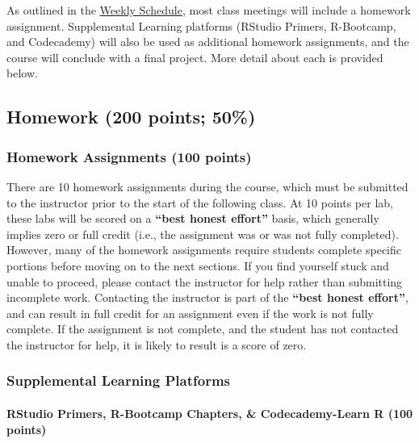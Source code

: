 \documentclass[
  letterpaper,
  DIV=11,
  numbers=noendperiod]{scrartcl}
\let\oldparagraph\paragraph
\renewcommand{\paragraph}[1]{\oldparagraph{#1}\mbox{}}
\begin{document}
As outlined in the \href{INCLUDE\%20LINK!!}{Weekly Schedule}, most class
meetings will include a homework assignment. Supplemental Learning
platforms (RStudio Primers, R-Bootcamp, and Codecademy) will also be
used as additional homework assignments, and the course will conclude
with a final project. More detail about each is provided below.

\hypertarget{homework-200-points-50}{%
\subsection{Homework (200 points; 50\%)}\label{homework-200-points-50}}

\hypertarget{homework-assignments-100-points}{%
\subsubsection{Homework Assignments (100
points)}\label{homework-assignments-100-points}}

There are 10 homework assignments during the course, which must be
submitted to the instructor prior to the start of the following class.
At 10 points per lab, these labs will be scored on a \textbf{``best
honest effort''} basis, which generally implies zero or full credit
(i.e., the assignment was or was not fully completed). However, many of
the homework assignments require students complete specific portions
before moving on to the next sections. If you find yourself stuck and
unable to proceed, please contact the instructor for help rather than
submitting incomplete work. Contacting the instructor is part of the
\textbf{``best honest effort''}, and can result in full credit for an
assignment even if the work is not fully complete. If the assignment is
not complete, and the student has not contacted the instructor for help,
it is likely to result is a score of zero.

\hypertarget{supplemental-learning-platforms}{%
\subsubsection{Supplemental Learning
Platforms}\label{supplemental-learning-platforms}}

\hypertarget{rstudio-primers-r-bootcamp-chapters-codecademy-learn-r-100-points}{%
\paragraph{RStudio Primers, R-Bootcamp Chapters, \& Codecademy-Learn R
(100
points)}\label{rstudio-primers-r-bootcamp-chapters-codecademy-learn-r-100-points}}
\end{document}
